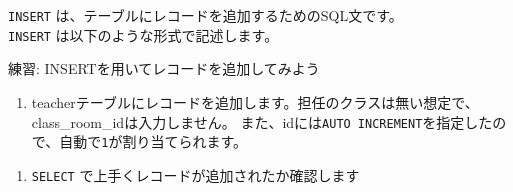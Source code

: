 \texttt{INSERT} は、テーブルにレコードを追加するためのSQL文です。\\
\texttt{INSERT} は以下のような形式で記述します。

\begin{Shaded}
\begin{Highlighting}[]
 
\NormalTok{) }\NormalTok{ (}
\NormalTok{);}
\end{Highlighting}
\end{Shaded}

練習: INSERTを用いてレコードを追加してみよう

\begin{enumerate}
\def\labelenumi{\arabic{enumi}.}
\tightlist
\item
  teacherテーブルにレコードを追加します。担任のクラスは無い想定で、class\_room\_idは入力しません。
  また、idには\texttt{AUTO\ INCREMENT}を指定したので、自動で\texttt{1}が割り当てられます。
\end{enumerate}

\begin{Shaded}
\begin{Highlighting}[]
\NormalTok{\# }
 
\NormalTok{) }\NormalTok{ (}
    \NormalTok{, }
\NormalTok{);}
\end{Highlighting}
\end{Shaded}

\begin{enumerate}
\def\labelenumi{\arabic{enumi}.}
\setcounter{enumi}{1}
\tightlist
\item
  \texttt{SELECT} で上手くレコードが追加されたか確認します
\end{enumerate}

\begin{Shaded}
\begin{Highlighting}[]
 \OperatorTok{*} 
\end{Highlighting}
\end{Shaded}

